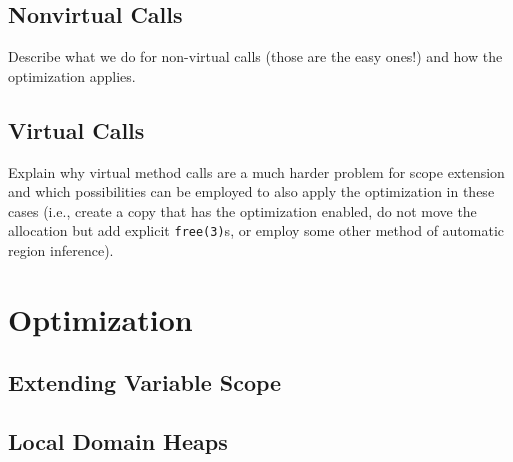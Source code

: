 		\subsection{Nonvirtual Calls}
			\label{sub:eea:analysis:nonvirtual}
			Describe what we do for non-virtual calls (those are the easy ones!) and how the optimization applies.

		\subsection{Virtual Calls}
			\label{sub:eea:analysis:virtual}
			Explain why virtual method calls are a much harder problem for scope extension and which possibilities can be
			employed to also apply the optimization in these cases (i.e., create a copy that has the optimization enabled, do
			not move the allocation but add explicit \texttt{free(3)}s, or employ some other method of automatic region
			inference).

	\section{Optimization}
		\label{sec:eea:opt}

		\subsection{Extending Variable Scope}
			\label{sub:eea:opt:scopeext}

		\subsection{Local Domain Heaps}
			\label{sub:eea:opt:ldh}
